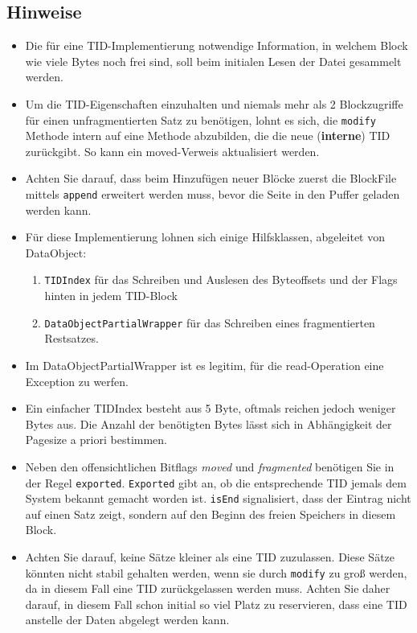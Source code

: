 \subsection{Hinweise}
\begin{itemize}
	\item Die für eine TID-Implementierung notwendige Information, in welchem Block wie viele Bytes noch frei sind, soll beim initialen Lesen der Datei gesammelt werden.
	\item Um die TID-Eigenschaften einzuhalten und niemals mehr als 2 Blockzugriffe für einen unfragmentierten Satz zu benötigen, lohnt es sich, die \texttt{modify} Methode intern auf eine Methode abzubilden, die die neue (\textbf{interne}) TID zurückgibt. So kann ein moved-Verweis aktualisiert werden.
	\item Achten Sie darauf, dass beim Hinzufügen neuer Blöcke zuerst die BlockFile mittels \texttt{append} erweitert werden muss, bevor die Seite in den Puffer geladen werden kann.
	\item Für diese Implementierung lohnen sich einige Hilfsklassen, abgeleitet von DataObject: \begin{enumerate}
		\item \texttt{TIDIndex} für das Schreiben und Auslesen des Byteoffsets und der Flags hinten in jedem TID-Block
		\item \texttt{DataObjectPartialWrapper} für das Schreiben eines fragmentierten Restsatzes.
	\end{enumerate}
	\item Im DataObjectPartialWrapper ist es legitim, für die read-Operation eine Exception zu werfen.
	\item Ein einfacher TIDIndex besteht aus 5 Byte, oftmals reichen jedoch weniger Bytes aus. Die Anzahl der benötigten Bytes lässt sich in Abhängigkeit der Pagesize a priori bestimmen.
	\item Neben den offensichtlichen Bitflags \textit{moved} und \textit{fragmented} benötigen Sie in der Regel \texttt{exported}. \texttt{Exported} gibt an, ob die entsprechende TID jemals dem System bekannt gemacht worden ist. \texttt{isEnd} signalisiert, dass der Eintrag nicht auf einen Satz zeigt, sondern auf den Beginn des freien Speichers in diesem Block.
	\item Achten Sie darauf, keine Sätze kleiner als eine TID zuzulassen. Diese Sätze könnten nicht stabil gehalten werden, wenn sie durch \texttt{modify} zu groß werden, da in diesem Fall eine TID zurückgelassen werden muss. Achten Sie daher darauf, in diesem Fall schon initial so viel Platz zu reservieren, dass eine TID anstelle der Daten abgelegt werden kann.

\end{itemize}

